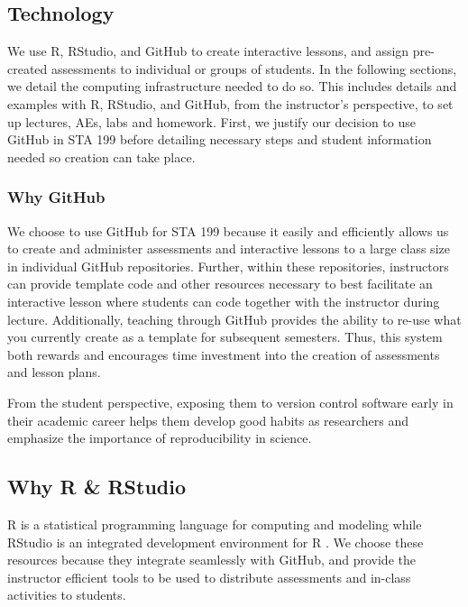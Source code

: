 \documentclass[
  12pt]{article}
\begin{document}
\hypertarget{sec-tech}{%
\subsection{Technology}\label{sec-tech}}

We use R, RStudio, and GitHub to create interactive lessons, and assign
pre-created assessments to individual or groups of students. In the
following sections, we detail the computing infrastructure needed to do
so. This includes details and examples with R, RStudio, and GitHub, from
the instructor's perspective, to set up lectures, AEs, labs and
homework. First, we justify our decision to use GitHub in STA 199 before
detailing necessary steps and student information needed so creation can
take place.

\hypertarget{why-github}{%
\subsubsection{Why GitHub}\label{why-github}}

We choose to use GitHub for STA 199 because it easily and efficiently
allows us to create and administer assessments and interactive lessons
to a large class size in individual GitHub repositories. Further, within
these repositories, instructors can provide template code and other
resources necessary to best facilitate an interactive lesson where
students can code together with the instructor during lecture.
Additionally, teaching through GitHub provides the ability to re-use
what you currently create as a template for subsequent semesters. Thus,
this system both rewards and encourages time investment into the
creation of assessments and lesson plans.

From the student perspective, exposing them to version control software
early in their academic career helps them develop good habits as
researchers and emphasize the importance of reproducibility in science.

\hypertarget{why-r-rstudio}{%
\subsection{Why R \& RStudio}\label{why-r-rstudio}}

R is a statistical programming language for computing and modeling while
RStudio is an integrated development environment for R \citep{Rcite}. We
choose these resources because they integrate seamlessly with GitHub,
and provide the instructor efficient tools to be used to distribute
assessments and in-class activities to students.
\end{document}
